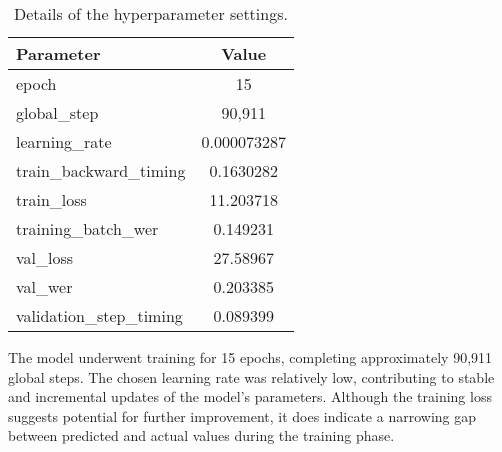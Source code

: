 


\begin{table}
\centering
\begin{tabular}{lc}
\hline
\textbf{Parameter} & \textbf{Value}\\
\hline
epoch & 15\\
global\_step & 90,911 \\
learning\_rate & 0.000073287 \\ 
train\_backward\_timing & 0.1630282 \\ 
train\_loss & 11.203718 \\
training\_batch\_wer & 0.149231  \\ 
val\_loss & 27.58967 \\ 
val\_wer & 0.203385 \\
validation\_step\_timing & 0.089399 \\\hline\end{tabular}
\caption{Details of the hyperparameter settings.
}
\label{tab:training_params}
\end{table}


The model underwent training for 15 epochs, completing approximately 90,911 global steps. The chosen learning rate was relatively low, contributing to stable and incremental updates of the model's parameters. Although the training loss suggests potential for further improvement, it does indicate a narrowing gap between predicted and actual values during the training phase.


